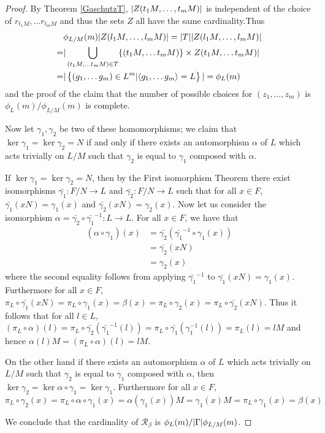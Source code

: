 \begin{proof}
    By Theorem \ref{GaschutzT}, $| Z(t_1M, \ldots , t_mM) |$ is independent of the choice of $r_{t_1M}, \ldots  r_{t_mM}$ and thus the sets $Z$ all have the same cardinality.Thus
    \begin{align*}
       &\phi_{L/M}(m)| Z(l_1M,\ldots,l_mM) | =  | T || Z(l_1M,\ldots,l_mM) | \\
       = &| \bigcup_{(t_1M, \ldots  t_mM) \in T}\{(t_1M, \ldots  t_mM)\} \times Z(t_1M, \ldots  t_mM)  | \\
       = &| \left\{ (g_1,\ldots g_m) \in L^m | \langle g_1,\ldots g_m \rangle = L \right\} | = \phi_L(m)
    \end{align*}
    and the proof of the claim that the number of possible choices for $(z_1,\ldots,z_m)$ is $\phi_L(m)/\phi_{L/M}(m)$ is complete.

    Now let $\gamma_1, \gamma_2$ be two of these homomorphisms; we claim that $\ker \gamma_1 = \ker \gamma_2 = N$ if and only if there exists an automorphism $\alpha$ of $L$ which acts trivially on $L/M$ such that $\gamma_2$ is equal to $\gamma_1$ composed with $\alpha$. 
    
    If $\ker \gamma_1 = \ker \gamma_2 = N$, then by the First isomorphism Theorem there exist isomorphisms $\bar{\gamma_1} \colon F/N \rightarrow L$ and $\bar{\gamma_2} \colon F/N \rightarrow L$ such that for all $x \in F$, $\bar{\gamma_1}(xN) = \gamma_1(x)$ and $\bar{\gamma_2}(xN) = \gamma_2(x)$. Now let us consider the isomorphism $\alpha = \bar{\gamma_2} \circ \bar{\gamma_1}^{-1} \colon L \rightarrow L.$ For all $x \in F$, we have that
    \begin{align*}
        (\alpha \circ \gamma_1)(x) &=  \bar{\gamma_2} (\bar{\gamma_1}^{-1}\circ \gamma_1(x)) \\
        &= \bar{\gamma_2}(xN) \\
        &= \gamma_2(x)
    \end{align*}
    where the second equality follows from applying $\bar{\gamma_1}^{-1}$ to $\bar{\gamma_1}(xN) = \gamma_1(x)$. Furthermore for all $x \in F$,
    $\pi_L \circ \bar{\gamma_1}(xN) = \pi_L \circ \gamma_1(x) = \beta(x) = \pi_L \circ \gamma_2(x) = \pi_L \circ \bar{\gamma_2}(xN)$. Thus it follows that for all $l \in L$, $(\pi_L \circ \alpha)(l) = \pi_L \circ \bar{\gamma_2}(\bar{\gamma_1}^{-1}(l)) = \pi_L \circ \bar{\gamma_1}(\gamma_1^{-1}(l)) = \pi_L(l) = lM$ and hence $\alpha(l)M = (\pi_L \circ \alpha)(l) = lM$.

    On the other hand if there exists an automorphism $\alpha$ of $L$ which acts trivially on $L/M$ such that $\gamma_2$ is equal to $\gamma_1$ composed with $\alpha$, then $\ker \gamma_2 = \ker \alpha \circ \gamma_1 = \ker \gamma_1$. Furthermore for all $x \in F$, $\pi_L \circ \gamma_2(x) = \pi_L \circ \alpha \circ \gamma_1(x) = \alpha(\gamma_1(x))M = \gamma_1(x)M = \pi_L \circ \gamma_1(x) = \beta(x)$

    We conclude that the cardinality of $\mathscr{R}_\beta$ is $\phi_L(m)/| \Gamma |\phi_{L/M}(m)$.
\end{proof}

